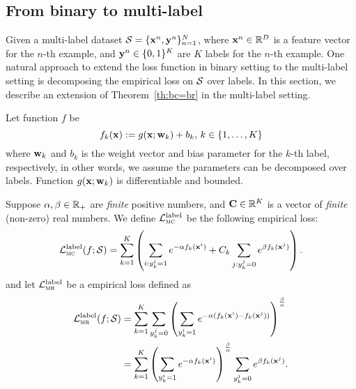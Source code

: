 \subsection{From binary to multi-label}
\label{sec:ml}

Given a multi-label dataset $\mathcal{S} = \{\mathbf{x}^n, \mathbf{y}^n\}_{n=1}^N$, where $\mathbf{x}^n \in \mathbb{R}^D$ is a feature vector for the $n$-th example,
and $\mathbf{y}^n \in \{0,1\}^K$ are $K$ labels for the $n$-th example.
One natural approach to extend the loss function in binary setting to the multi-label setting is 
decomposing the empirical loss on $\mathcal{S}$ over labels.
In this section, we describe an extension of Theorem~\ref{th:bc=br} in the multi-label setting.

Let function $f$ be
\begin{equation*}
f_k(\mathbf{x}) := g(\mathbf{x}; \mathbf{w}_k) + b_k, \, k \in \{1,\dots,K\}
\end{equation*}
where $\mathbf{w}_k$ and $b_k$ is the weight vector and bias parameter for the $k$-th label, respectively,
in other words, we assume the parameters can be decomposed over labels.
Function $g(\mathbf{x}; \mathbf{w}_k)$ is differentiable and bounded.

Suppose $\alpha, \beta \in \mathbb{R}_+$ are \emph{finite} positive numbers, 
and $\mathbf{C} \in \mathbb{R}^K$ is a vector of \emph{finite} (non-zero) real numbers.
We define $\mathcal{L}_\textsc{mc}^\text{label}$ be the following empirical loss:
\begin{equation}
\label{eq:mc1}
\displaystyle
\mathcal{L}_\textsc{mc}^\text{label}(f; \mathcal{S})
= \sum_{k=1}^K \left(
      \sum_{i: y_k^i = 1} e^{-\alpha f_k(\mathbf{x}^i)} +
  C_k \sum_{j: y_k^j = 0} e^{ \beta  f_k(\mathbf{x}^j)} \right).
\end{equation}
and let $\mathcal{L}_\textsc{mr}^\text{label}$ be a empirical loss defined as
\begin{equation}
\label{eq:mr1}
\begin{aligned}
\displaystyle
\mathcal{L}_\textsc{mr}^\text{label}(f; \mathcal{S})
&= \sum_{k=1}^K
   \sum_{y_k^j = 0} \left( \sum_{y_k^i = 1} e^{-\alpha(f_k(\mathbf{x}^i) - f_k(\mathbf{x}^j))} \right)^\frac{\beta}{\alpha} \\
&= \sum_{k=1}^K \left( 
   \sum_{y_k^i = 1} e^{-\alpha f_k(\mathbf{x}^i)} \right)^\frac{\beta}{\alpha} 
   \sum_{y_k^j = 0} e^{ \beta  f_k(\mathbf{x}^j)}.
\end{aligned}
\end{equation}


